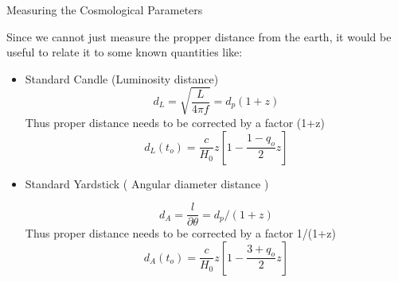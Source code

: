 \begin{frame}{Measuring the Cosmological Parameters}

	Since we cannot just measure the propper distance from the earth, it
	would be useful to relate it to some known quantities like:

	\begin{itemize}
		\item Standard Candle (Luminosity distance)
			$$ d_L =  \sqrt{\frac{L}{4\pi f}} = d_p(1+z) $$
			Thus proper distance needs to be corrected by a factor
			(1+z)
	$$ d_L(t_o) = \frac{c}{H_0} z \left[ 1 - \frac{1-q_o}{2} z \right] $$
		\item Standard Yardstick ( Angular diameter distance )

			$$ d_A =  \frac{l}{\partial \theta} = d_p/(1+z) $$
			Thus proper distance needs to be corrected by a factor
			1/(1+z)
	$$ d_A(t_o) = \frac{c}{H_0} z \left[ 1 - \frac{3+q_o}{2} z \right] $$

	\end{itemize}
\end{frame}

